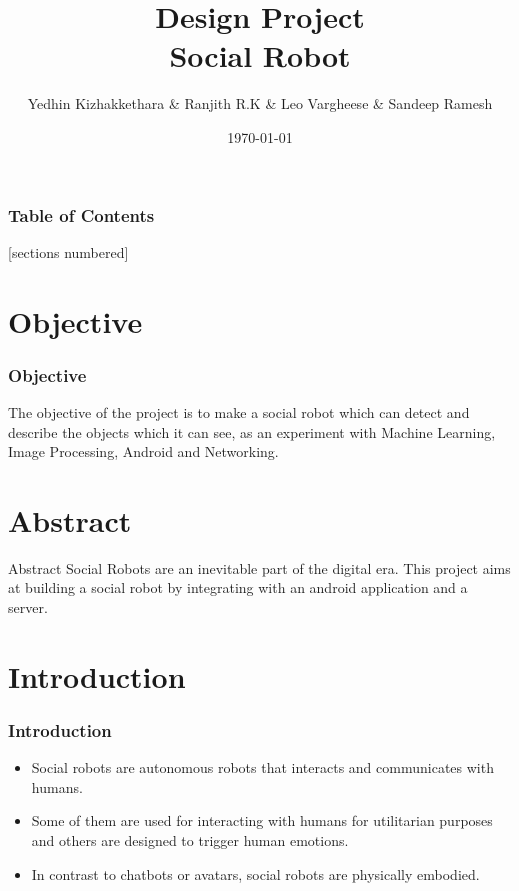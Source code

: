 \documentclass{beamer}
\title[Design Project]{Design Project\\Social Robot}
\author{Yedhin Kizhakkethara \& Ranjith R.K \& Leo Vargheese \& Sandeep Ramesh}
\institute{Federal Institute of Science and Technology (FISAT)}
\date{\today}
\begin{document}
\begin{frame}
	\titlepage
\end{frame}

\begin{frame}
	\frametitle{Table of Contents}
	[sections numbered]
	\tableofcontents[hideallsubsections]
\end{frame}


\section{Objective}
\begin{frame}
	\frametitle{Objective}
	The objective of the project is to make a social robot which can detect and describe the objects which it can see, as an experiment with Machine Learning, Image Processing, Android and Networking.
\end{frame}

\section{Abstract}
\begin{frame}{Abstract}
	Social Robots are an inevitable part of the digital era. This project aims at building a social robot by integrating with an android application and a server.
\end{frame}

\section{Introduction}
\begin{frame}
	\frametitle{Introduction}
	\begin{itemize}
		\item Social robots are autonomous robots that interacts and communicates with humans.
		\item Some of them are used for interacting with humans for utilitarian purposes and others are designed to trigger human emotions.
		\item In contrast to chatbots or avatars, social robots are physically embodied.
	\end{itemize}
\end{frame}
\end{document}

